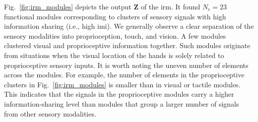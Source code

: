 Fig.~\ref{fig:irm_modules} depicts the output $\bm{Z}$ of the \ac{irm}. It found $N_\text{c} = 23$ functional modules corresponding to clusters of sensory signals with high information sharing (i.e., high \ac{imi}). We generally observe a clear separation of the sensory modalities into proprioception, touch, and vision. A few modules clustered visual and proprioceptive information together. Such modules originate from situations when the visual location of the hands is solely related to proprioceptive sensory inputs. It is worth noting the uneven number of elements across the modules. For example, the number of elements in the proprioceptive clusters in Fig.~\ref{fig:irm_modules} is smaller than in visual or tactile modules. This indicates that the signals in the proprioceptive modules carry a higher information-sharing level than modules that group a larger number of signals from other sensory modalities.

